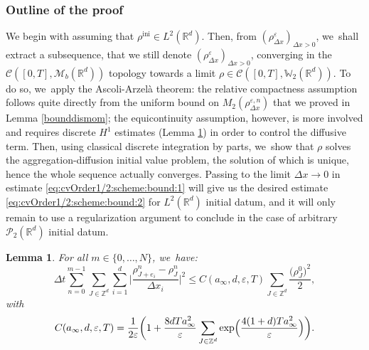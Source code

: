 \documentclass[JEP,XML,SOM,Unicode, NoFloatCountersInSection,published]{cedram}
\newcommand{\ini}{\mathrm{ini}}
\def\RR{\mathbb{R}}
\def\ZZ{\mathbb{Z}}
\def\WW{\mathbb{W}}
\def\eps{\varepsilon}
\def\dt{\Delta t}
\def\dx{\Delta x}
\def\calC{{\mathcal C}}
\def\calM{{\mathcal M}}
\def\calP{{\mathcal P}}
\theoremstyle{plain}
\newtheorem{lemma}[theorem]{Lemma}
\theoremstyle{definition}
\begin{document}
\subsubsection*{Outline of the proof}
We begin with assuming that $\rho^{\ini} \in L^2(\RR^d)$. Then, from $(\rho_{\dx}^\eps)_{\dx > 0}$, we~shall extract a subsequence, that we still denote $(\rho_{\dx}^\eps)_{\dx > 0}$, converging in the $\calC([0,T], \calM_b(\RR^d))$ topology towards a limit $\rho \in \calC([0,T], \WW_2(\RR^d))$. To do so, we~apply the Ascoli-Arzelà theorem: the relative compactness assumption follows quite directly from the uniform bound on $M_2(\rho_{\dx}^{\eps,n})$ that we proved in Lemma \ref{bounddismom}; the equicontinuity assumption, however, is more involved and requires discrete $H^1$ estimates (Lemma \ref{lemma:DiscreteH1Estimates}) in order to control the diffusive term. Then, using classical discrete integration by parts, we~show that $\rho$ solves the aggregation-diffusion initial value problem, the solution of which is unique, hence the whole sequence actually converges. Passing to the limit $\dx \to 0$ in estimate \eqref{eq:cvOrder1/2:scheme:bound:1} will give us the desired estimate \eqref{eq:cvOrder1/2:scheme:bound:2} for $L^2(\RR^d)$ initial datum, and it will only remain to use a regularization argument to conclude in the case of arbitrary $\calP_2(\RR^d)$ initial datum.
\begin{lemma}\label{lemma:DiscreteH1Estimates}
For all $m \in \{0, \ldots, N\}$, we~have:
\[
\dt\sum_{n=0}^{m-1} \sum_{J \in \ZZ^d} \sum_{i=1}^d \Big|\frac{\rho_{J+e_i}^n - \rho_J^n}{\dx_i}\Big|^2 \leq C(a_\infty, d, \eps,T) \sum_{J\in\ZZ^d} \frac{\big(\rho_J^0\big)^2}{2},
\]
with
\[
C(a_\infty, d, \eps,T) =
\frac{1}{2 \eps}\biggl(1 + \frac{8dT a_\infty^2}{\eps} \sum_{J\in\ZZ^d}
\exp\Bigl(\frac{4(1 + d)T a_\infty^2}{\eps}\Bigr)\biggr).
\]
\end{lemma}
\end{document}
